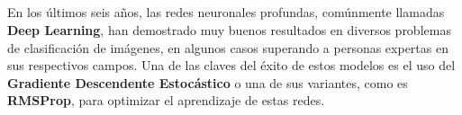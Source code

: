 \documentclass[../proyecto.tex]{memoir}
\begin{document}
\thispagestyle{empty}

\begin{center}
  {\large\bfseries \ProjectTitle}\\
\end{center}
  \begin{center}
  	
  \AuthorName\\
  \vspace{0.7cm}
  \\

  \vspace{0.7cm}
  \\

%  
%  
\end{center}

 
En los últimos seis años, las redes neuronales profundas, comúnmente llamadas \textbf{Deep Learning}, han demostrado muy buenos resultados en diversos problemas de clasificación de imágenes, en algunos casos superando a personas expertas en sus respectivos campos. Una de las claves del éxito de estos modelos es el uso del \textbf{Gradiente Descendente Estocástico} o una de sus variantes, como es \textbf{RMSProp}, para optimizar el aprendizaje de estas redes. \\
\end{document}
